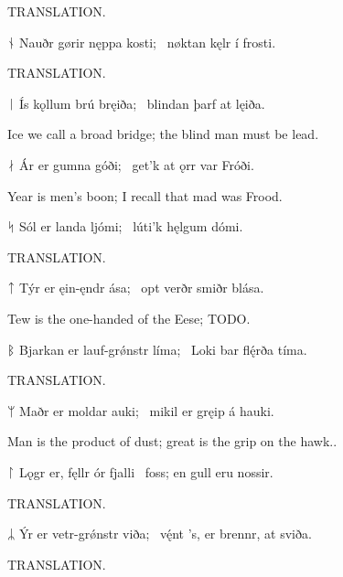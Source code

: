 \bvb TRANSLATION.\evb\evg


\bvg\bva ᚾ Nauðr gørir nęppa kosti; \hld\ nøktan kęlr í frosti.\eva

\bvb TRANSLATION.\evb\evg


\bvg\bva ᛁ Ís kǫllum brú bręiða; \hld\ blindan þarf at lęiða.\eva

\bvb Ice we call a broad bridge; the blind man must be lead.\evb\evg


\bvg\bva ᛅ Ár er gumna góði; \hld\ get’k at ǫrr var Fróði.\eva

\bvb Year is men’s boon; I recall that mad was Frood.\evb\evg


\bvg\bva ᛋ Sól er landa ljómi; \hld\ lúti’k hęlgum dómi.\eva

\bvb TRANSLATION.\evb\evg


\bvg\bva ᛏ Týr er ęin-ęndr ása; \hld\ opt verðr smiðr blása.\eva

\bvb Tew is the one-handed of the Eese; TODO.\evb\evg


\bvg\bva ᛒ Bjarkan er lauf-grǿnstr líma; \hld\ Loki bar flę́rða tíma.\eva

\bvb TRANSLATION.\evb\evg


\bvg\bva ᛘ Maðr er moldar auki; \hld\ mikil er gręip á hauki.\eva

\bvb Man is the product of dust; great is the grip on the hawk..\evb\evg


\bvg\bva ᛚ Lǫgr er, fęllr ór fjalli \hld\ foss; en gull eru nossir.\eva

\bvb TRANSLATION.\evb\evg


\bvg\bva ᛦ Ýr er vetr-grǿnstr viða; \hld\ vę́nt ’s, er brennr, at sviða. \eva

\bvb TRANSLATION.\evb\evg

\sectionline
